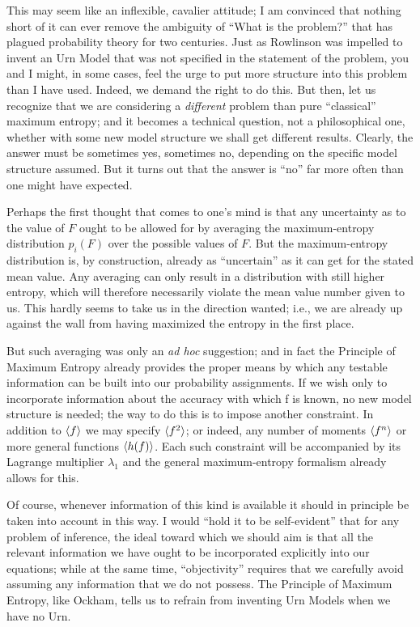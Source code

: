 {This may seem like an inflexible, cavalier attitude; I am convinced that nothing short of it can ever remove the ambiguity of ``What is the problem?'' that has plagued probability theory for two centuries.
Just as Rowlinson was impelled to invent an Urn Model that was not specified in the statement of the problem, you and I might, in some cases, feel the urge to put more structure into this problem than I have used.
Indeed, we demand the right to do this.
But then, let us recognize that we are considering a \emph{different} problem than pure ``classical'' maximum entropy; and it becomes a technical question, not a philosophical one, whether with some new model structure we shall get different results.
Clearly, the answer must be sometimes yes, sometimes no, depending on the specific model structure assumed.
But it turns out that the answer is ``no'' far more often than one might have expected.

Perhaps the first thought that comes to one's mind is that any uncertainty as to the value of $F$ ought to be allowed for by averaging the maximum-entropy distribution $p_i(F)$ over the possible values of $F$.
But the maximum-entropy distribution is, by construction, already as ``uncertain'' as it can get for the stated mean value.
Any averaging can only result in a distribution with still higher entropy, which will therefore necessarily violate the mean value number given to us.
This hardly seems to take us in the direction wanted; i.e., we are already up against the wall from having maximized the entropy in the first place.

But such averaging was only an \emph{ad hoc} suggestion; and in fact the Principle of Maximum Entropy already provides the proper means by which any testable information can be built into our probability assignments.
If we wish only to incorporate information about the accuracy with which f is known, no new model structure is needed; the way to do this is to impose another constraint.
In addition to $\langle f\rangle$ we may specify $\langle f^2\rangle$; or indeed, any number of moments $\langle f^n\rangle$ or more general functions $\langle h(f)\rangle$.
Each such constraint will be accompanied by its Lagrange multiplier $\lambda_1$ and the general maximum-entropy formalism already allows for this.

Of course, whenever information of this kind is available it should in principle be taken into account in this way.
I would ``hold it to be self-evident'' that for any problem of inference, the ideal toward which we should aim is that all the relevant information we have ought to be incorporated explicitly into our equations; while at the same time, ``objectivity'' requires that we carefully avoid assuming any information that we do not possess.
The Principle of Maximum Entropy, like Ockham, tells us to refrain from inventing Urn Models when we have no Urn.

}
